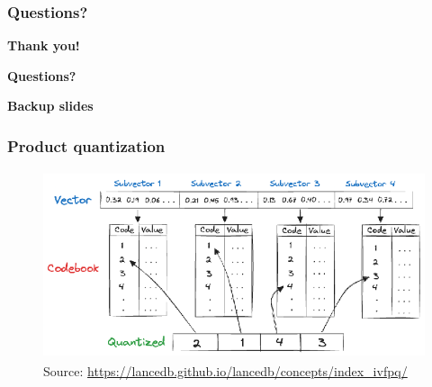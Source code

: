 \documentclass[10pt,utf8]{beamer}
\begin{document}
\begin{frame}
    \frametitle{Questions?}
    \centering
     \textbf{\Huge{Thank you!}}
    
    \vspace{1.5cm}
    
    \textbf{\Huge{Questions?}}
    
    \vspace{1cm}
\end{frame}


\begin{frame}
    \centering
    \huge{\textbf{Backup slides}}
\end{frame}

\begin{frame}
    \frametitle{Product quantization}
    \begin{figure}
        \centering
        \includegraphics[height=5.5cm]{./img/product_quantization.eps}
        \caption{\tiny{Source: \url{https://lancedb.github.io/lancedb/concepts/index_ivfpq/}}}
    \end{figure}
\end{frame}
\end{document}
